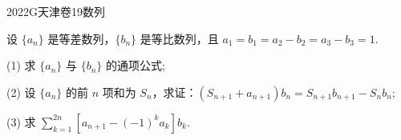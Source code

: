 
\begin{problem}{2022}{G}{天津卷}{19}{数列}

设 $\{a_n\}$ 是等差数列，$\{b_n\}$ 是等比数列，且 $a_1=b_1=a_2-b_2=a_3-b_3=1$.

(1) 求 $\{a_n\}$ 与 $\{b_n\}$ 的通项公式;

(2) 设 $\{a_n\}$ 的前 $n$ 项和为 $S_n$，求证：$(S_{n+1}+a_{n+1})b_n=S_{n+1} b_{n+1}-S_n b_n$;

(3) 求 $\sum\limits_{k=1}^{2n} [a_{n+1}-(-1)^k a_k] b_k$.

\end{problem}